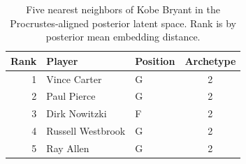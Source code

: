 \begin{table}[htbp]
  \centering\small
  \begin{tabular}{rllc}
    \toprule
    Rank & Player & Position & Archetype \\
    \midrule
    1 & Vince Carter & G & 2 \\
    2 & Paul Pierce & G & 2 \\
    3 & Dirk Nowitzki & F & 2 \\
    4 & Russell Westbrook & G & 2 \\
    5 & Ray Allen & G & 2 \\
    \bottomrule
  \end{tabular}
  \caption{Five nearest neighbors of Kobe Bryant in the Procrustes-aligned posterior latent space. Rank is by posterior mean embedding distance.}
\end{table}

